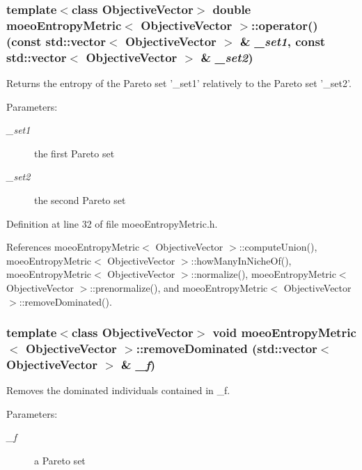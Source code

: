 \subsubsection{\setlength{\rightskip}{0pt plus 5cm}template$<$class Objective\-Vector$>$ double {\bf moeo\-Entropy\-Metric}$<$ Objective\-Vector $>$::operator() (const std::vector$<$ Objective\-Vector $>$ \& {\em \_\-set1}, const std::vector$<$ Objective\-Vector $>$ \& {\em \_\-set2})\hspace{0.3cm}{\tt  [inline]}}\label{classmoeoEntropyMetric_191a8cdda7873e20338e678c5a7b927b}


Returns the entropy of the Pareto set '\_\-set1' relatively to the Pareto set '\_\-set2'. 

\begin{Desc}
\item[Parameters:]
\begin{description}
\item[{\em \_\-set1}]the first Pareto set \item[{\em \_\-set2}]the second Pareto set \end{description}
\end{Desc}


Definition at line 32 of file moeo\-Entropy\-Metric.h.

References moeo\-Entropy\-Metric$<$ Objective\-Vector $>$::compute\-Union(), moeo\-Entropy\-Metric$<$ Objective\-Vector $>$::how\-Many\-In\-Niche\-Of(), moeo\-Entropy\-Metric$<$ Objective\-Vector $>$::normalize(), moeo\-Entropy\-Metric$<$ Objective\-Vector $>$::prenormalize(), and moeo\-Entropy\-Metric$<$ Objective\-Vector $>$::remove\-Dominated().
\subsubsection{\setlength{\rightskip}{0pt plus 5cm}template$<$class Objective\-Vector$>$ void {\bf moeo\-Entropy\-Metric}$<$ Objective\-Vector $>$::remove\-Dominated (std::vector$<$ Objective\-Vector $>$ \& {\em \_\-f})\hspace{0.3cm}{\tt  [inline, private]}}\label{classmoeoEntropyMetric_198a717fd0bab0bb91346399c1021f82}


Removes the dominated individuals contained in \_\-f. 

\begin{Desc}
\item[Parameters:]
\begin{description}
\item[{\em \_\-f}]a Pareto set \end{description}
\end{Desc}


